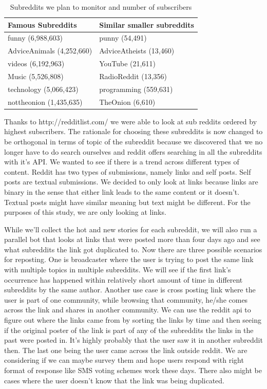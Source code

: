 \documentclass{article} %
\begin{document}
\begin{table}
\begin{center}
    \begin{tabular}{ | l | l | }
    \hline
    Famous Subreddits & Similar smaller subreddits \\ \hline
    funny (6,988,603) & punny (54,491) \\ \hline
    AdviceAnimals (4,252,660) & AdviceAtheists (13,460) \\ \hline
    videos (6,192,963) & YouTube (21,611) \\ \hline
    Music (5,526,808) & RadioReddit (13,356) \\ \hline
    technology (5,066,423) & programming (559,631) \\ \hline
    nottheonion (1,435,635) & TheOnion (6,610) \\ 
    \hline
    \end{tabular}
    \caption{Subreddits we plan to monitor and number of subscribers}
    \end{center}
\end{table}


Thanks to http://redditlist.com/ we were able to look at sub reddits ordered by highest subscribers. The rationale for choosing these subreddits is now changed to be orthogonal in terms of topic of the subreddit because we discovered that we no longer have to do search ourselves and reddit offers searching in all the subreddits with it's API. We wanted to see if there is a trend across different types of content. Reddit has two types of submissions, namely links and self posts. Self posts are textual submissions. We decided to only look at links because links are binary in the sense that either link leads to the same content or it doesn't. Textual posts might have similar meaning but text might be different. For the purposes of this study, we are only looking at links. 

While we'll collect the hot and new stories for each subreddit, we will also run a parallel bot that looks at links that were posted more than four days ago and see what subreddits the link got duplicated to. Now there are three possible scenarios for reposting. One is broadcaster where the user is trying to post the same link with multiple topics in multiple subreddits. We will see if the first link's occurrence has happened within relatively short amount of time in different subreddits by the same author. Another use case is cross posting link where the user is part of one community, while browsing that community, he/she comes across the link and shares in another community. We can use the reddit api to figure out where the links came from by sorting the links by time and then seeing if the original poster of the link is part of any of the subreddits the links in the past were posted in. It's highly probably that the user saw it in another subreddit then. The last one being the user came across the link outside reddit. We are considering if we can maybe survey them and hope users respond with right format of response like SMS voting schemes work these days. There also might be cases where the user doesn't know that the link was being duplicated. 
\end{document}
